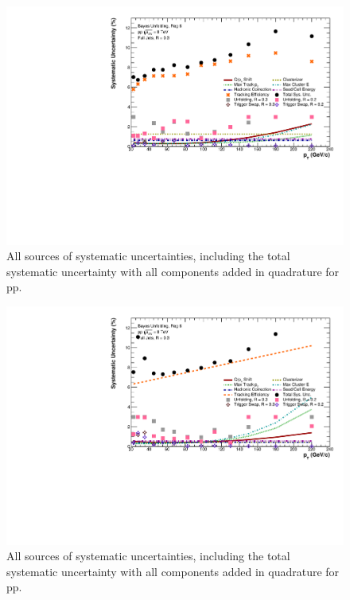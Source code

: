 \documentclass[ALICE]{ALICE_analysis_notes}
\newcommand{\pp}{pp\xspace}
\begin{document}
\begin{figure}
    \centering
    \includegraphics[width=15cm]{figures/Systematics/ratios/TotalSystematics_R02R03.pdf}
    \caption{All sources of systematic uncertainties, including the total systematic uncertainty with all components added in quadrature for \pp.}
    \label{fig:SystematicsRatiosR02}
\end{figure}

\begin{figure}
    \centering
    \includegraphics[width=15cm]{figures/pPbFigures/Systematics/ratios/TotalSystematics_R02R03.pdf}
    \caption{All sources of systematic uncertainties, including the total systematic uncertainty with all components added in quadrature for \pp.}
    \label{fig:SystematicsRatiosR02pPb}
\end{figure}
\end{document}
